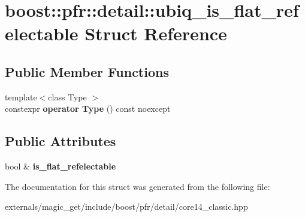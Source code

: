 \hypertarget{structboost_1_1pfr_1_1detail_1_1ubiq__is__flat__refelectable}{}\section{boost\+:\+:pfr\+:\+:detail\+:\+:ubiq\+\_\+is\+\_\+flat\+\_\+refelectable Struct Reference}
\label{structboost_1_1pfr_1_1detail_1_1ubiq__is__flat__refelectable}
\subsection*{Public Member Functions}
\begin{DoxyCompactItemize}
\item 
\mbox{\label{structboost_1_1pfr_1_1detail_1_1ubiq__is__flat__refelectable_aaf82555634fd88b4ad4676caf2a16441}} 
{\footnotesize template$<$class Type $>$ }\\constexpr {\bfseries operator Type} () const noexcept
\end{DoxyCompactItemize}
\subsection*{Public Attributes}
\begin{DoxyCompactItemize}
\item 
\mbox{\label{structboost_1_1pfr_1_1detail_1_1ubiq__is__flat__refelectable_a7b02329d0410317bd619cf90dc4ea0ec}} 
bool \& {\bfseries is\+\_\+flat\+\_\+refelectable}
\end{DoxyCompactItemize}


The documentation for this struct was generated from the following file\+:\begin{DoxyCompactItemize}
\item 
externals/magic\+\_\+get/include/boost/pfr/detail/core14\+\_\+classic.\+hpp\end{DoxyCompactItemize}
